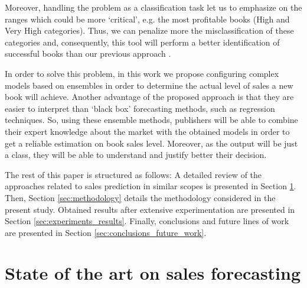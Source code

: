\documentclass[a4paper,10pt,onecolumn,preprint,3p]{elsarticle}
\begin{document}
Moreover, handling the problem as a classification task let us to emphasize on the ranges which could be more `critical', e.g. the most profitable books (High and Very High categories). Thus, we can penalize more the misclassification of these categories and, consequently, this tool will perform a better identification of successful books than our previous approach \cite{Castillo2016books}.

In order to solve this problem, in this work we propose configuring complex models based on ensembles \cite{Qiu2014} in order to determine the actual level of sales a new book will achieve.
Another advantage of the proposed approach is that they are easier to interpret than `black box' forecasting methods, such as regression techniques. So, using these ensemble methods, publishers will be able to combine their expert knowledge about the 
market with the obtained models in order to get a reliable estimation 
on book sales level. Moreover, as the output will be just a class, they will be able to understand and justify better their decision.


The rest of this paper is structured as follows: 
A detailed review of the approaches related to sales prediction in similar scopes is presented in Section \ref{sec:soa}.
Then, Section \ref{sec:methodology} details the methodology considered in the present study. 
Obtained results after extensive experimentation are presented in Section \ref{sec:experiments_results}.
Finally, conclusions and future lines of work are presented in Section \ref{sec:conclusions_future_work}.


\section{State of the art on sales forecasting} 
\label{sec:soa}
\end{document}
